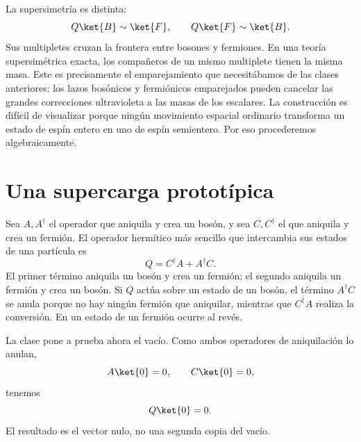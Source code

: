 La supersimetría es distinta:
\begin{equation}
Q\ket{B}\sim\ket{F},
\qquad
Q\ket{F}\sim\ket{B}.
\end{equation}
Sus multipletes cruzan la frontera entre bosones y fermiones. En una teoría supersimétrica exacta, los compañeros de un mismo multiplete tienen la misma masa. Este es precisamente el emparejamiento que necesitábamos de las clases anteriores: los lazos bosónicos y fermiónicos emparejados pueden cancelar las grandes correcciones ultravioleta a las masas de los escalares. La construcción es difícil de visualizar porque ningún movimiento espacial ordinario transforma un estado de espín entero en uno de espín semientero. Por eso procederemos algebraicamente.

\section{Una supercarga prototípica}

Sea \(A,A^\dagger\) el operador que aniquila y crea un bosón, y sea \(C,C^\dagger\) el que aniquila y crea un fermión. El operador hermítico más sencillo que intercambia sus estados de una partícula es
\begin{equation}
Q=C^\dagger A+A^\dagger C.
\end{equation}
El primer término aniquila un bosón y crea un fermión; el segundo aniquila un fermión y crea un bosón. Si \(Q\) actúa sobre un estado de un bosón, el término \(A^\dagger C\) se anula porque no hay ningún fermión que aniquilar, mientras que \(C^\dagger A\) realiza la conversión. En un estado de un fermión ocurre al revés.

\begin{classroomqa}
\end{classroomqa}

La clase pone a prueba ahora el vacío. Como ambos operadores de aniquilación lo anulan,
\begin{equation}
A\ket{0}=0,\qquad C\ket{0}=0,
\end{equation}
tenemos
\begin{equation}
Q\ket{0}=0.
\end{equation}
El resultado es el vector nulo, no una segunda copia del vacío.

